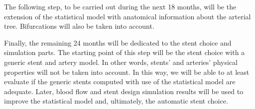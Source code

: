 \documentclass[a4paper]{article}
\begin{document}
The following step, to be carried out during the next 18 months, will be the extension of the statistical model with anatomical information about the arterial tree. Bifurcations will also be taken into account. 

Finally, the remaining 24 months will be dedicated to the stent choice and simulation parts. The starting point of this step will be the stent choice with a generic stent and artery model. In other words, stents' and arteries' physical properties will not be taken into account. In this way, we will be able to at least evaluate if the generic stents computed with use of the statistical model are adequate. Later, blood flow and stent design simulation results will be used to improve the statistical model and, ultimately, the automatic stent choice.  




\end{document}
